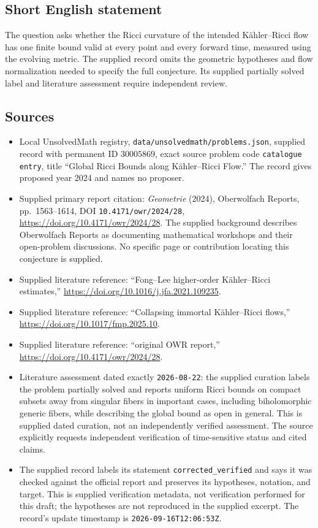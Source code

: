 \documentclass[11pt]{article}
\begin{document}
\subsection{Short English statement}
The question asks whether the Ricci curvature of the intended Kähler--Ricci flow has one finite bound valid at every point and every forward time, measured using the evolving metric. The supplied record omits the geometric hypotheses and flow normalization needed to specify the full conjecture. Its supplied partially solved label and literature assessment require independent review.
\subsection{Sources}
\begin{itemize}
\item Local UnsolvedMath registry, \texttt{data/unsolvedmath/problems.json}, supplied record with permanent ID \(30005869\), exact source problem code \texttt{catalogue entry}, title ``Global Ricci Bounds along Kähler--Ricci Flow.'' The record gives proposed year 2024 and names no proposer.
\item Supplied primary report citation: \emph{Geometrie} (2024), Oberwolfach Reports, pp.\ 1563--1614, DOI \texttt{10.4171/owr/2024/28}, \url{https://doi.org/10.4171/owr/2024/28}. The supplied background describes Oberwolfach Reports as documenting mathematical workshops and their open-problem discussions. No specific page or contribution locating this conjecture is supplied.
\item Supplied literature reference: ``Fong--Lee higher-order Kähler--Ricci estimates,'' \url{https://doi.org/10.1016/j.jfa.2021.109235}.
\item Supplied literature reference: ``Collapsing immortal Kähler--Ricci flows,'' \url{https://doi.org/10.1017/fmp.2025.10}.
\item Supplied literature reference: ``original OWR report,'' \url{https://doi.org/10.4171/owr/2024/28}.
\item Literature assessment dated exactly \texttt{2026-08-22}: the supplied curation labels the problem partially solved and reports uniform Ricci bounds on compact subsets away from singular fibers in important cases, including biholomorphic generic fibers, while describing the global bound as open in general. This is supplied dated curation, not an independently verified assessment. The source explicitly requests independent verification of time-sensitive status and cited claims.
\item The supplied record labels its statement \texttt{corrected\_verified} and says it was checked against the official report and preserves its hypotheses, notation, and target. This is supplied verification metadata, not verification performed for this draft; the hypotheses are not reproduced in the supplied excerpt. The record's update timestamp is \texttt{2026-09-16T12:06:53Z}.

\end{itemize}
\end{document}
